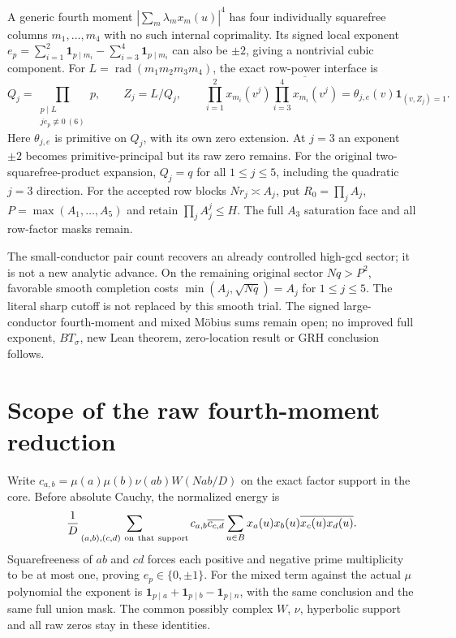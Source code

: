 \documentclass[11pt,oneside,openany]{book}
\theoremstyle{definition}\newtheorem{definition}[theorem]{Definition}
\theoremstyle{remark}\newtheorem{remark}[theorem]{Remark}
\begin{document}
A generic fourth moment $|\sum_m\lambda_mx_m(u)|^4$ has four individually
squarefree columns $m_1,\ldots,m_4$ with no such internal coprimality.
Its signed local exponent
$e_p=\sum_{i=1}^2\mathbf1_{p\mid m_i}-\sum_{i=3}^4\mathbf1_{p\mid m_i}$
can also be $\pm2$, giving a nontrivial cubic component. For $L=\operatorname{rad}(m_1m_2m_3m_4)$, the exact row-power
interface is
\[
 Q_j=\prod_{\substack{p\mid L\\je_p\not\equiv0\ (6)}}p,\qquad
 Z_j=L/Q_j,\qquad
 \prod_{i=1}^2x_{m_i}(v^j)
       \overline{\prod_{i=3}^4x_{m_i}(v^j)}
 =\theta_{j,e}(v)\mathbf1_{(v,Z_j)=1}.
\]
Here $\theta_{j,e}$ is primitive on $Q_j$, with its own zero extension.
At $j=3$ an exponent $\pm2$ becomes primitive-principal but its raw
zero remains. For the original two-squarefree-product expansion,
$Q_j=q$ for all $1\le j\le5$, including the quadratic $j=3$ direction.
For the accepted row blocks $Nr_j\asymp A_j$, put
$R_0=\prod_jA_j$, $P=\max(A_1,\ldots,A_5)$ and retain
$\prod_jA_j^j\le H$. The full $A_3$ saturation face and all row-factor
masks remain.

The small-conductor pair count recovers an already controlled high-gcd
sector; it is not a new analytic advance. On the remaining original
sector $Nq>P^2$, favorable smooth completion
costs $\min(A_j,\sqrt{Nq})=A_j$ for $1\le j\le5$.
The literal sharp cutoff is not replaced by this smooth trial.
The signed large-conductor fourth-moment and mixed M\"obius sums remain
open; no improved full exponent, $BT_\sigma$, new Lean theorem,
zero-location result or GRH conclusion follows.

\section{Scope of the raw fourth-moment reduction}
\label{upq:details}
Write $c_{a,b}=\mu(a)\mu(b)\nu(ab)W(Nab/D)$ on the exact factor support
in the core. Before absolute Cauchy, the normalized energy is
\[
 \frac1D\sum_{\substack{(a,b),(c,d)\ {\rm on\ that\ support}}}
 c_{a,b}\overline{c_{c,d}}
 \sum_{u\in B}x_a(u)x_b(u)\overline{x_c(u)x_d(u)}.
\]
Squarefreeness of $ab$ and $cd$ forces each positive and negative
prime multiplicity to be at most one, proving $e_p\in\{0,\pm1\}$.
For the mixed term against the actual $\mu$ polynomial the exponent is
$\mathbf1_{p\mid a}+\mathbf1_{p\mid b}-\mathbf1_{p\mid n}$,
with the same conclusion and the same full union mask.
The common possibly complex $W$, $\nu$, hyperbolic support and all raw
zeros stay in these identities.
\end{document}
